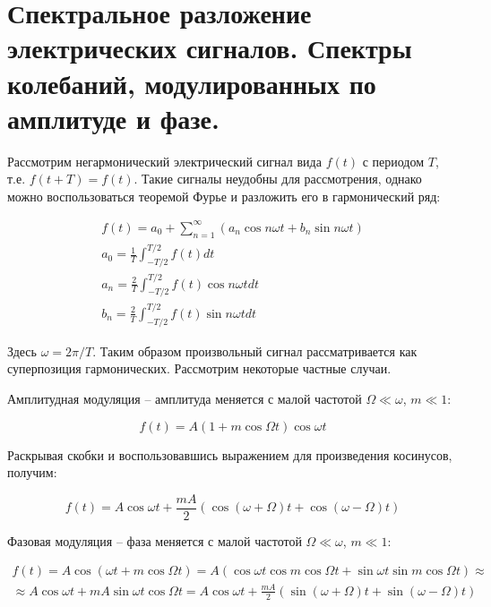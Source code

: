 \section{Спектральное разложение электрических сигналов. Спектры колебаний, модулированных по амплитуде и фазе.}

Рассмотрим негармонический электрический сигнал вида $f(t)$ с периодом $T$, т.е. $f(t + T) = f(t)$. Такие сигналы неудобны для рассмотрения, однако можно воспользоваться теоремой Фурье и разложить его в гармонический ряд:

\begin{align}
    f(t) = a_0 + \sum_{n = 1}^\infty \left( a_n \cos n \omega t + b_n \sin n \omega t \right) \\
    a_0 = \frac{1}{T} \int_{- T / 2}^{T / 2} f(t) d t \\
    a_n = \frac{2}{T} \int_{- T / 2}^{T / 2} f(t) \cos n \omega t d t \\
    b_n = \frac{2}{T} \int_{- T / 2}^{T / 2} f(t) \sin n \omega t d t
\end{align}

\noindent
Здесь $\omega = 2 \pi / T$. Таким образом произвольный сигнал рассматривается как суперпозиция гармонических. Рассмотрим некоторые частные случаи.

Амплитудная модуляция -- амплитуда меняется с малой частотой $\Omega \ll \omega$, $m \ll 1$:

\begin{equation}
    f(t) = A \left( 1 + m \cos \Omega t \right) \cos \omega t
\end{equation}

\noindent
Раскрывая скобки и воспользовавшись выражением для произведения косинусов, получим:

\begin{equation}
    f(t) = A \cos \omega t + \frac{m A}{2} \left( \cos \left( \omega + \Omega \right) t + \cos \left( \omega - \Omega \right) t \right)
\end{equation}

Фазовая модуляция -- фаза меняется с малой частотой $\Omega \ll \omega$, $m \ll 1$:

\begin{multline}
    f(t) = A \cos \left( \omega t + m \cos \Omega t \right) = A \left( \cos \omega t \cos m \cos \Omega t + \sin \omega t \sin m \cos \Omega t \right) \approx \\
    \approx A \cos \omega t + m A \sin \omega t \cos \Omega t = A \cos \omega t + \frac{m A}{2} \left( \sin \left( \omega + \Omega \right) t + \sin \left( \omega - \Omega \right) t \right)
\end{multline}